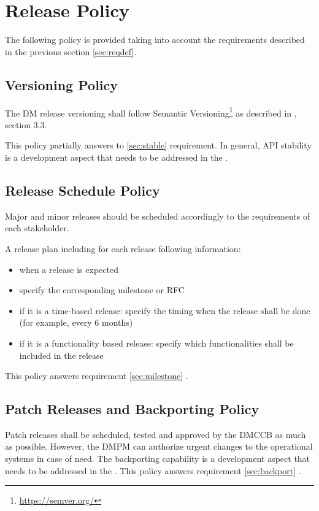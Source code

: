 \section{Release Policy} \label{sec:policy}

The following policy is provided taking into account the requirements described in the previous section \ref{sec:reqdef}.


\subsection{Versioning Policy} \label{sec:versinopolicy}

The DM release versioning shall follow Semantic Versioning\footnote{\url{https://semver.org/}} as described in , section 3.3.

This policy partially answers to \ref{sec:stable} requirement.
In general, API stability is a development aspect that needs to be addressed in the .


\subsection{Release Schedule Policy} \label{sec:schedulepolicy}

Major and minor releases should be scheduled accordingly to the requirements of each stakeholder.

A release plan including for each release following information:

\begin{itemize}
\item when a release is expected
\item specify the corresponding milestone or RFC
\item if it is a time-based release: specify the timing when the release shall be done (for example, every 6 months)
\item if it is a functionality based release: specify which functionalities shall be included in the release
\end{itemize}

This policy answers requirement \ref{sec:milestone} .


\subsection{Patch Releases and Backporting Policy} \label{sec:patchpolicy}

Patch releases shall be scheduled, tested and approved by the DMCCB as much as possible.
However, the DMPM can authorize urgent changes to the operational systems in case of need.
The backporting capability is a development aspect that needs to be addressed in the .
This policy answers requirement  \ref{sec:backport} .


